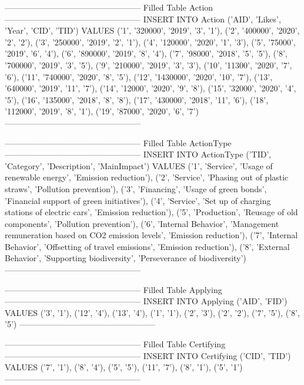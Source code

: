 --------------------------------------------------
Filled Table Action
--------------------------------------------------
INSERT INTO 
Action ('AID', 'Likes', 'Year', 'CID', 'TID')
VALUES ('1', '320000', '2019', '3', '1'),
	('2', '400000', '2020', '2', '2'),
	('3', '250000', '2019', '2', '1'),
	('4', '120000', '2020', '1', '3'),
	('5', '75000', '2019', '6', '4'),
	('6', '890000', '2019', '8', '4'),
	('7', '98000', '2018', '5', '5'),
	('8', '700000', '2019', '3', '5'),
	('9', '210000', '2019', '3', '3'),
	('10', '11300', '2020', '7', '6'),
	('11', '740000', '2020', '8', '5'),
	('12', '1430000', '2020', '10', '7'),
	('13', '640000', '2019', '11', '7'),
	('14', '12000', '2020', '9', '8'),
	('15', '32000', '2020', '4', '5'),
	('16', '135000', '2018', '8', '8'),
	('17', '430000', '2018', '11', '6'),
	('18', '112000', '2019', '8', '1'),
	('19', '87000', '2020', '6', '7')
--------------------------------------------------

--------------------------------------------------
Filled Table ActionType
--------------------------------------------------
INSERT INTO 
ActionType ('TID', 'Category', 'Description', 'MainImpact')
VALUES ('1', 'Service', 'Usage of renewable energy', 'Emission reduction'),
	('2', 'Service', 'Phasing out of plastic straws', 'Pollution prevention'),
	('3', 'Financing', 'Usage of green bonds', 'Financial support of green initiatives'),
	('4', 'Service', 'Set up of charging stations of electric cars', 'Emission reduction'),
	('5', 'Production', 'Reusage of old components', 'Pollution prevention'),
	('6', 'Internal Behavior', 'Management remuneration based on CO2 emission levels', 'Emission reduction'),
	('7', 'Internal Behavior', 'Offsetting of travel emissions', 'Emission reduction'),
	('8', 'External Behavior', 'Supporting biodiversity', 'Perseverance of biodiversity')
--------------------------------------------------

--------------------------------------------------
Filled Table Applying
--------------------------------------------------
INSERT INTO 
Applying ('AID', 'FID')
VALUES ('3', '1'),
	('12', '4'),
	('13', '4'),
	('1', '1'),
	('2', '3'),
	('2', '2'),
	('7', '5'),
	('8', '5')
--------------------------------------------------

--------------------------------------------------
Filled Table Certifying
--------------------------------------------------
INSERT INTO 
Certifying ('CID', 'TID')
VALUES ('7', '1'),
	('8', '4'),
	('5', '5'),
	('11', '7'),
	('8', '1'),
	('5', '1')
--------------------------------------------------

